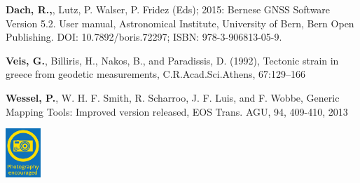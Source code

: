 \documentclass[landscape,a0paper,fontscale=0.346]{baposter} %
\begin{document}
\begin{poster}
{\begin{minipage}[b]{0.92\linewidth}
{\textbf{Dach, R.,}, Lutz, P. Walser, P. Fridez (Eds); 2015: Bernese GNSS Software Version 5.2. User manual, Astronomical Institute, University of Bern, Bern Open Publishing. DOI: 10.7892/boris.72297; ISBN: 978-3-906813-05-9.

\textbf{Veis, G.}, Billiris, H., Nakos, B., and Paradissis, D. (1992), Tectonic strain in greece from geodetic measurements, C.R.Acad.Sci.Athens, 67:129--166

\textbf{Wessel, P.}, W. H. F. Smith, R. Scharroo, J. F. Luis, and F. Wobbe, Generic Mapping Tools: Improved version released, EOS Trans. AGU, 94, 409-410, 2013
}
\end{minipage}
\begin{minipage}[b]{0.06\linewidth}
\includegraphics[height=5em]{../../logos/graphic_egu_photo_yes.png}
\end{minipage}
}






\end{poster}
\end{document}
